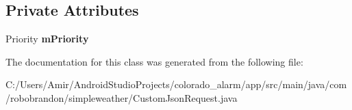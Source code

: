 \subsection*{Private Attributes}
\begin{DoxyCompactItemize}
\item 
Priority {\bfseries m\+Priority}\hypertarget{classcom_1_1robobrandon_1_1simpleweather_1_1_custom_json_request_a6f67cf51f22bab671dd1fb10d2acfa2d}{}\label{classcom_1_1robobrandon_1_1simpleweather_1_1_custom_json_request_a6f67cf51f22bab671dd1fb10d2acfa2d}

\end{DoxyCompactItemize}


The documentation for this class was generated from the following file\+:\begin{DoxyCompactItemize}
\item 
C\+:/\+Users/\+Amir/\+Android\+Studio\+Projects/colorado\+\_\+alarm/app/src/main/java/com/robobrandon/simpleweather/Custom\+Json\+Request.\+java\end{DoxyCompactItemize}

